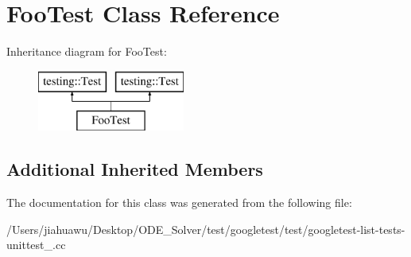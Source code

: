 \hypertarget{class_foo_test}{}\section{Foo\+Test Class Reference}
\label{class_foo_test}
Inheritance diagram for Foo\+Test\+:\begin{figure}[H]
\begin{center}
\leavevmode
\includegraphics[height=2.000000cm]{class_foo_test}
\end{center}
\end{figure}
\subsection*{Additional Inherited Members}


The documentation for this class was generated from the following file\+:\begin{DoxyCompactItemize}
\item 
/\+Users/jiahuawu/\+Desktop/\+O\+D\+E\+\_\+\+Solver/test/googletest/test/googletest-\/list-\/tests-\/unittest\+\_\+.\+cc\end{DoxyCompactItemize}
